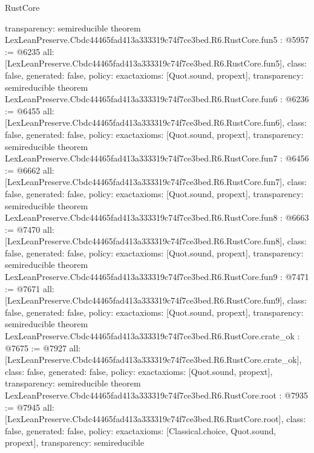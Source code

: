 \begin{lexlean}{RustCore}
\begin{coremodule}
{  transparency: semireducible
}
theorem LexLeanPreserve.Cbdc44465fad413a333319c74f7ce3bed.R6.RustCore.fun5 : @5957 := @6235 {
  all: [LexLeanPreserve.Cbdc44465fad413a333319c74f7ce3bed.R6.RustCore.fun5],
  class: false,
  generated: false,
  policy: exact{axioms: [Quot.sound, propext]},
  transparency: semireducible
}
theorem LexLeanPreserve.Cbdc44465fad413a333319c74f7ce3bed.R6.RustCore.fun6 : @6236 := @6455 {
  all: [LexLeanPreserve.Cbdc44465fad413a333319c74f7ce3bed.R6.RustCore.fun6],
  class: false,
  generated: false,
  policy: exact{axioms: [Quot.sound, propext]},
  transparency: semireducible
}
theorem LexLeanPreserve.Cbdc44465fad413a333319c74f7ce3bed.R6.RustCore.fun7 : @6456 := @6662 {
  all: [LexLeanPreserve.Cbdc44465fad413a333319c74f7ce3bed.R6.RustCore.fun7],
  class: false,
  generated: false,
  policy: exact{axioms: [Quot.sound, propext]},
  transparency: semireducible
}
theorem LexLeanPreserve.Cbdc44465fad413a333319c74f7ce3bed.R6.RustCore.fun8 : @6663 := @7470 {
  all: [LexLeanPreserve.Cbdc44465fad413a333319c74f7ce3bed.R6.RustCore.fun8],
  class: false,
  generated: false,
  policy: exact{axioms: [Quot.sound, propext]},
  transparency: semireducible
}
theorem LexLeanPreserve.Cbdc44465fad413a333319c74f7ce3bed.R6.RustCore.fun9 : @7471 := @7671 {
  all: [LexLeanPreserve.Cbdc44465fad413a333319c74f7ce3bed.R6.RustCore.fun9],
  class: false,
  generated: false,
  policy: exact{axioms: [Quot.sound, propext]},
  transparency: semireducible
}
theorem LexLeanPreserve.Cbdc44465fad413a333319c74f7ce3bed.R6.RustCore.crate_ok : @7675 := @7927 {
  all: [LexLeanPreserve.Cbdc44465fad413a333319c74f7ce3bed.R6.RustCore.crate_ok],
  class: false,
  generated: false,
  policy: exact{axioms: [Quot.sound, propext]},
  transparency: semireducible
}
theorem LexLeanPreserve.Cbdc44465fad413a333319c74f7ce3bed.R6.RustCore.root : @7935 := @7945 {
  all: [LexLeanPreserve.Cbdc44465fad413a333319c74f7ce3bed.R6.RustCore.root],
  class: false,
  generated: false,
  policy: exact{axioms: [Classical.choice, Quot.sound, propext]},
  transparency: semireducible
}


\end{coremodule}
\end{lexlean}
